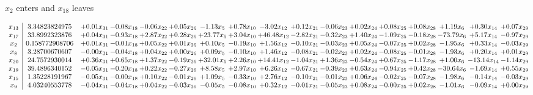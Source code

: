 \documentclass[9pt]{article}
\begin{document}
 $ x_{2} $ enters and $ x_{18} $ leaves 

 \[\begin{array}{c| c c@{\hskip 2pt} c@{\hskip 2pt} c@{\hskip 2pt} c@{\hskip 2pt} c@{\hskip 2pt} c@{\hskip 2pt} c@{\hskip 2pt} c@{\hskip 2pt} c@{\hskip 2pt} c@{\hskip 2pt} c@{\hskip 2pt} c@{\hskip 2pt} c@{\hskip 2pt} c@{\hskip 2pt} c@{\hskip 2pt} }
 x_{13}   &  3.34823824975 & +  0.01 x_{31} & -0.08 x_{18} & -0.06 x_{22} & +  0.05 x_{26} & -1.13 x_{5} & +  0.78 x_{10} & -3.02 x_{12} & +  0.12 x_{21} & -0.06 x_{23} & +  0.02 x_{24} & +  0.08 x_{25} & +  0.08 x_{28} & +  1.19 x_{6} & +  0.30 x_{14} & +  0.07 x_{29}\\
 x_{17}   &  33.8992323876 & +  0.04 x_{31} & -0.93 x_{18} & +  2.87 x_{22} & +  0.28 x_{26} & + 23.77 x_{5} & +  3.04 x_{10} & + 46.48 x_{12} & -2.82 x_{21} & -0.32 x_{23} & +  1.40 x_{24} & -1.09 x_{25} & -0.18 x_{28} & -73.79 x_{6} & +  5.17 x_{14} & -0.97 x_{29}\\
 x_{2}   &  0.158772908706 & +  0.01 x_{31} & -0.01 x_{18} & +  0.05 x_{22} & +  0.01 x_{26} & +  0.10 x_{5} & -0.19 x_{10} & +  1.56 x_{12} & -0.10 x_{21} & -0.03 x_{23} & +  0.05 x_{24} & -0.07 x_{25} & +  0.02 x_{28} & -1.95 x_{6} & +  0.33 x_{14} & -0.03 x_{29}\\
 x_{8}   &  3.28700670607 & -0.00 x_{31} & -0.04 x_{18} & +  0.04 x_{22} & +  0.00 x_{26} & +  0.09 x_{5} & -0.10 x_{10} & +  1.46 x_{12} & -0.08 x_{21} & -0.02 x_{23} & +  0.02 x_{24} & -0.08 x_{25} & -0.01 x_{28} & -1.93 x_{6} & +  0.20 x_{14} & +  0.01 x_{29}\\
 x_{20}   &  24.7572930014 & +  0.36 x_{31} & +  0.65 x_{18} & +  1.37 x_{22} & -0.19 x_{26} & + 32.01 x_{5} & +  2.26 x_{10} & + 14.41 x_{12} & -1.04 x_{21} & +  1.36 x_{23} & -0.54 x_{24} & +  0.67 x_{25} & -1.17 x_{28} & +  1.00 x_{6} & -13.14 x_{14} & -1.14 x_{29}\\
 x_{19}   &  39.4896340152 & -0.05 x_{31} & -0.20 x_{18} & +  0.22 x_{22} & -0.27 x_{26} & +  8.58 x_{5} & +  2.97 x_{10} & +  6.26 x_{12} & -0.67 x_{21} & -0.39 x_{23} & +  0.63 x_{24} & -0.94 x_{25} & +  0.42 x_{28} & -30.64 x_{6} & -1.69 x_{14} & +  0.55 x_{29}\\
 x_{15}   &  1.35228191967 & -0.05 x_{31} & -0.00 x_{18} & +  0.10 x_{22} & -0.01 x_{26} & +  1.09 x_{5} & -0.33 x_{10} & +  2.76 x_{12} & -0.10 x_{21} & -0.01 x_{23} & +  0.06 x_{24} & -0.02 x_{25} & -0.07 x_{28} & -1.98 x_{6} & -0.14 x_{14} & -0.03 x_{29}\\
 x_{9}   &  4.03240553778 & -0.04 x_{31} & -0.04 x_{18} & +  0.04 x_{22} & -0.03 x_{26} & -0.05 x_{5} & -0.08 x_{10} & +  0.32 x_{12} & -0.01 x_{21} & -0.05 x_{23} & +  0.08 x_{24} & -0.00 x_{25} & +  0.02 x_{28} & -1.01 x_{6} & -0.09 x_{14} & +  0.00 x_{29}\\

\end{array}\]
\end{document}
